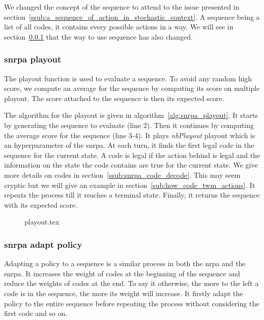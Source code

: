 We changed the concept of the sequence to attend to the issue presented in section~\ref{ssub:a_sequence_of_action_in_stochastic_context}.
A sequence being a list of all codes, it contains every possible actions in a way.
We will see in section~\ref{ssub:srnpa_playout} that the way to use sequence has also changed.

\subsubsection{\acrshort{snrpa} playout}%
\label{ssub:srnpa_playout}

The playout function is used to evaluate a sequence.
To avoid any random high score, we compute an average for the sequence by computing its score on multiple playout.
The score attached to the sequence is then its expected score.

The algorithm for the playout is given in algorithm~\ref{alg:snrpa_playout}.
It starts by generating the sequence to evaluate (line 2).
Then it continues by computing the average score for the sequence (line 3-4).
It plays \textit{nbPlayout}  playout which is an hyperparameter of the \gls{snrpa}.
At each turn, it finds the first legal code in the sequence for the current state.
A code is legal if the action behind is legal and the information on the state the code contains are true for the current state.
We give more details on codes in section~\ref{ssub:snrpa_code_decode}.
This may seem cryptic but we will give an example in section~\ref{sub:how_code_twm_actions}.
It repeats the process till it reaches a terminal state.
Finally, it returns the sequence with its expected score.

\begin{figure}[htpb]
    \centering
    \begin{minipage}{.7\linewidth}
        {playout.tex}
    \end{minipage}
\end{figure}

\subsubsection{\acrshort{snrpa} adapt policy}%
\label{ssub:snrpa_adapt_policy}

Adapting a policy to a sequence is a similar process in both the \gls{nrpa} and the \gls{snrpa}.
It increases the weight of codes at the beginning of the sequence and reduce the weights of codes at the end.
To say it otherwise, the more to the left a code is in the sequence, the more its weight will increase.
It firstly adapt the policy to the entire sequence before repeating the process without considering the first code and so on.

